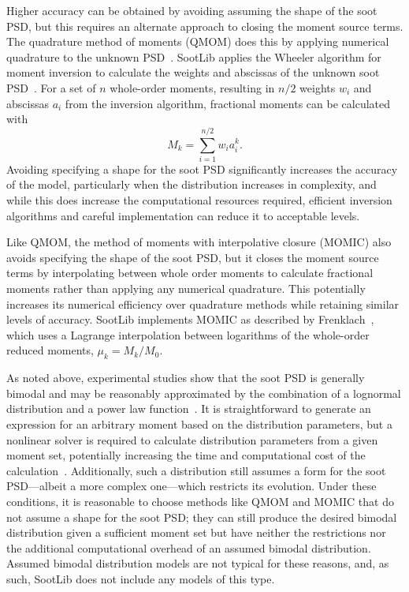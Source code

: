 \documentclass[preprint,letterpaper]{elsarticle}
\begin{document}
Higher accuracy can be obtained by avoiding assuming the shape of the soot PSD, but this requires an alternate approach to closing the moment source terms. The quadrature method of moments (QMOM) does this by applying numerical quadrature to the unknown PSD~\cite{McGraw_1997}. SootLib applies the Wheeler algorithm for moment inversion to calculate the weights and abscissas of the unknown soot PSD~\cite{Marchisio_2013,Wheeler_1974}. For a set of $n$ whole-order moments, resulting in $n/2$ weights $w_i$ and abscissas $a_i$ from the inversion algorithm, fractional moments can be calculated with
\begin{equation} \label{e:soot-models-psd-mk}
M_k = \sum_{i=1}^{n/2} w_i a_i^k.
\end{equation}
Avoiding specifying a shape for the soot PSD significantly increases the accuracy of the model, particularly when the distribution increases in complexity, and while this does increase the computational resources required, efficient inversion algorithms and careful implementation can reduce it to acceptable levels.

Like QMOM, the method of moments with interpolative closure (MOMIC) also avoids specifying the shape of the soot PSD, but it closes the moment source terms by interpolating between whole order moments to calculate fractional moments rather than applying any numerical quadrature. This potentially increases its numerical efficiency over quadrature methods while retaining similar levels of accuracy. SootLib implements MOMIC as described by Frenklach~\cite{Frenklach_2002b,Frenklach_1987}, which uses a Lagrange interpolation between logarithms of the  whole-order reduced moments, $\mu_k = M_k/M_0$.

As noted above, experimental studies show that the soot PSD is generally bimodal and may be reasonably approximated by the combination of a lognormal distribution and a power law function~\cite{Zhao_2003,Zhao_2003b,Wang_2009,Wang_2011,Gu_2016}. It is straightforward to generate an expression for an arbitrary moment based on the distribution parameters, but a nonlinear solver is required to calculate distribution parameters from a given moment set, potentially increasing the time and computational cost of the calculation~\cite{Lignell_2008b}. Additionally, such a distribution still assumes a form for the soot PSD---albeit a more complex one---which restricts its evolution. Under these conditions, it is reasonable to choose methods like QMOM and MOMIC that do not assume a shape for the soot PSD; they can still produce the desired bimodal distribution given a sufficient moment set but have neither the restrictions nor the additional computational overhead of an assumed bimodal distribution. Assumed bimodal distribution models are not typical for these reasons, and, as such, SootLib does not include any models of this type.
\end{document}
